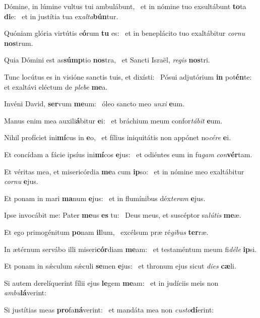 \item Dómine, in lúmine vultus tui ambulábunt,~\pscross{} et in nómine tuo exsultábunt \textbf{to}ta \textbf{di}e:~\psstar{} et in justítia tua ex\textit{alta}\textbf{bún}tur.
\item Quóniam glória virtútis e\textbf{ó}rum \textbf{tu} es:~\psstar{} et in beneplácito tuo exaltábitur \textit{cornu} \textbf{nos}trum.
\item Quia Dómini est as\textbf{súmp}tio \textbf{nos}tra,~\psstar{} et Sancti Israël, \textit{regis} \textbf{nos}tri.
\item Tunc locútus es in visióne sanctis tuis, et dixísti:~\pscross{} Pósui adjutórium \textbf{in} pot\textbf{én}te:~\psstar{} et exaltávi eléctum de \textit{plebe} \textbf{me}a.
\item Invéni David, \textbf{ser}vum \textbf{me}um:~\psstar{} óleo sancto meo \textit{unxi} \textbf{e}um.
\item Manus enim mea auxili\textbf{á}bitur \textbf{e}i:~\psstar{} et bráchium meum confor\textit{tábit} \textbf{e}um.
\item Nihil profíciet ini\textbf{mí}cus in \textbf{e}o,~\psstar{} et fílius iniquitátis non appónet no\textit{cére} \textbf{e}i.
\item Et concídam a fácie ipsíus ini\textbf{mí}cos \textbf{e}jus:~\psstar{} et odiéntes eum in fu\textit{gam} \textit{con}\textbf{vér}tam.
\item Et véritas mea, et misericórdia \textbf{me}a cum \textbf{ip}so:~\psstar{} et in nómine meo exaltábitur \textit{cornu} \textbf{e}jus.
\item Et ponam in mari \textbf{ma}num \textbf{e}jus:~\psstar{} et in flumínibus déx\textit{teram} \textbf{e}jus.
\item Ipse invocábit me: Pater \textbf{me}us \textbf{es} tu:~\psstar{} Deus meus, et suscéptor sa\textit{lútis} \textbf{me}æ.
\item Et ego primogénitum \textbf{po}nam \textbf{il}lum,~\psstar{} excélsum præ ré\textit{gibus} \textbf{ter}ræ.
\item In ætérnum servábo illi miseri\textbf{cór}diam \textbf{me}am:~\psstar{} et testaméntum meum fi\textit{déle} \textbf{ip}si.
\item Et ponam in sǽculum sǽculi \textbf{se}men \textbf{e}jus:~\psstar{} et thronum ejus sicut \textit{dies} \textbf{cæ}li.
\item Si autem derelíquerint fílii ejus \textbf{le}gem \textbf{me}am:~\psstar{} et in judíciis meis non \textit{ambu}\textbf{lá}verint:
\item Si justítias meas \textbf{pro}fa\textbf{ná}ve\-rint:~\psstar{} et mandáta mea non \textit{custo}\textbf{dí}erint:

